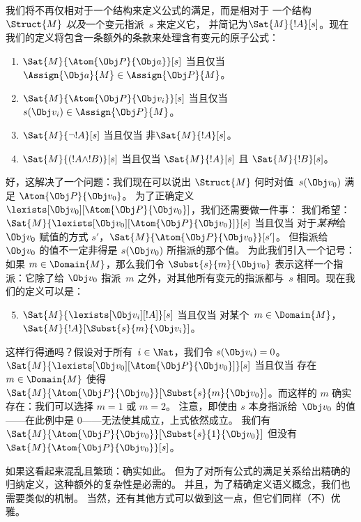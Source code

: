 \documentclass[../../../include/open-logic-section]{subfiles}
\begin{document}
我们将不再仅相对于一个结构来定义公式的满足，而是相对于
一个结构~$\Struct{M}$ \emph{以及}一个变元指派~$s$ 来定义它，
并简记为$\Sat{M}{!A}[s]$。现在我们的定义将包含一条额外的条款来处理含有变元的原子公式：

\begin{enumerate}
  \item $\Sat{M}{\Atom{\Obj P}{\Obj a}}[s]$ 当且仅当
  $\Assign{\Obj a}{M} \in \Assign{\Obj P}{M}$。
  \item $\Sat{M}{\Atom{\Obj P}{\Obj v_i}}[s]$ 当且仅当
  $s(\Obj v_i) \in \Assign{\Obj P}{M}$。
  \item $\Sat{M}{\lnot !A}[s]$ 当且仅当 非$\Sat{M}{!A}[s]$。
  \item $\Sat{M}{(!A \land !B)}[s]$ 当且仅当 $\Sat{M}{!A}[s]$ 且 $\Sat{M}{!B}[s]$。
\end{enumerate}

好，这解决了一个问题：我们现在可以说出 $\Struct{M}$ 何时对值~$s(\Obj v_0)$ 满足 $\Atom{\Obj P}{\Obj v_0}$。
为了正确定义 $\lexists[\Obj v_0][\Atom{\Obj P}{\Obj
v_0}]$，我们还需要做一件事：
我们希望：$\Sat{M}{\lexists[\Obj v_0][\Atom{\Obj P}{\Obj v_0}]}[s]$ 当且仅当
对于\emph{某种}给~$\Obj v_0$ 赋值的方式 $s'$，$\Sat{M}{\Atom{\Obj P}{\Obj v_0}}[s']$。
但指派给~$\Obj v_0$ 的值不一定非得是 $s(\Obj v_0)$ 所指派的那个值。
为此我们引入一个记号：如果 $m \in \Domain{M}$，那么我们令 $\Subst{s}{m}{\Obj v_0}$ 表示这样一个指派：它除了给 $\Obj v_0$ 指派~$m$ 之外，对其他所有变元的指派都与~$s$ 相同。现在我们的定义可以是：

\begin{enumerate}\setcounter{enumi}{4}
  \item $\Sat{M}{\lexists[\Obj v_i][!A]}[s]$ 当且仅当
  对某个~$m \in \Domain{M}$，$\Sat{M}{!A}[\Subst{s}{m}{\Obj v_i}]$。
\end{enumerate}

这样行得通吗？假设对于所有~$i \in \Nat$，我们令 $s(\Obj v_i) = 0$。
$\Sat{M}{\lexists[\Obj v_0][\Atom{\Obj P}{\Obj v_0}]}[s]$ 当且仅当
存在 $m \in \Domain{M}$ 使得 $\Sat{M}{\Atom{\Obj P}{\Obj
v_0}}[\Subst{s}{m}{\Obj v_0}]$。而这样的 $m$ 确实存在：我们可以选择 $m = 1$ 或 $m = 2$。
注意，即使由 $s$ 本身指派给~$\Obj v_0$ 的值——在此例中是 $0$——无法使其成立，上式依然成立。
我们有 $\Sat{M}{\Atom{\Obj P}{\Obj v_0}}[\Subst{s}{1}{\Obj
v_0}]$ 但没有 $\Sat{M}{\Atom{\Obj P}{\Obj v_0}}[s]$。

如果这看起来混乱且繁琐：确实如此。
但为了对所有公式的满足关系给出精确的归纳定义，这种额外的复杂性是必需的。
并且，为了精确定义语义概念，我们也需要类似的机制。
当然，还有其他方式可以做到这一点，但它们同样（不）优雅。
\end{document}
